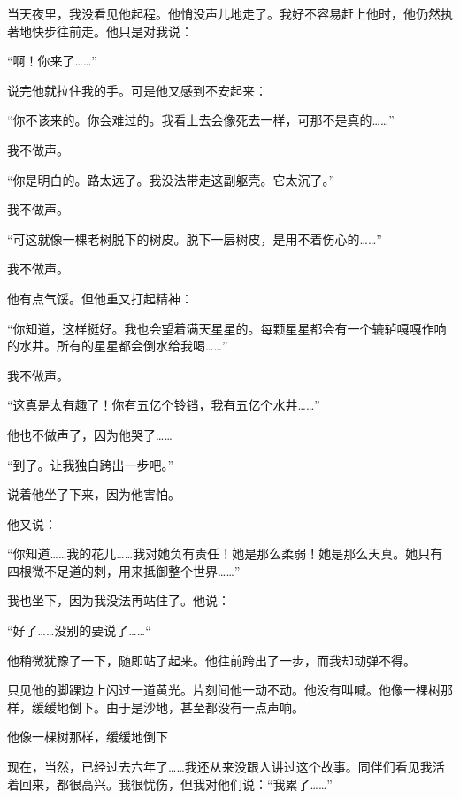 当天夜里，我没看见他起程。他悄没声儿地走了。我好不容易赶上他时，他仍然执著地快步往前走。他只是对我说：

“啊！你来了\ldots{}\ldots{}”

说完他就拉住我的手。可是他又感到不安起来：

“你不该来的。你会难过的。我看上去会像死去一样，可那不是真的\ldots{}\ldots{}”

我不做声。

“你是明白的。路太远了。我没法带走这副躯壳。它太沉了。”

我不做声。

“可这就像一棵老树脱下的树皮。脱下一层树皮，是用不着伤心的\ldots{}\ldots{}”

我不做声。

他有点气馁。但他重又打起精神：

“你知道，这样挺好。我也会望着满天星星的。每颗星星都会有一个辘轳嘎嘎作响的水井。所有的星星都会倒水给我喝\ldots{}\ldots{}”

我不做声。

“这真是太有趣了！你有五亿个铃铛，我有五亿个水井\ldots{}\ldots{}”

他也不做声了，因为他哭了\ldots{}\ldots{}

“到了。让我独自跨出一步吧。”

说着他坐了下来，因为他害怕。

他又说：

“你知道\ldots{}\ldots{}我的花儿\ldots{}\ldots{}我对她负有责任！她是那么柔弱！她是那么天真。她只有四根微不足道的刺，用来抵御整个世界\ldots{}\ldots{}”

我也坐下，因为我没法再站住了。他说：

“好了\ldots{}\ldots{}没别的要说了\ldots{}\ldots{}“

他稍微犹豫了一下，随即站了起来。他往前跨出了一步，而我却动弹不得。

只见他的脚踝边上闪过一道黄光。片刻间他一动不动。他没有叫喊。他像一棵树那样，缓缓地倒下。由于是沙地，甚至都没有一点声响。

{\startalignment[center]
 \stopalignment}

他像一棵树那样，缓缓地倒下


\stoptitle

\starttitle[title={27},reference={part0029.html_a030}]

现在，当然，已经过去六年了\ldots{}\ldots{}我还从来没跟人讲过这个故事。同伴们看见我活着回来，都很高兴。我很忧伤，但我对他们说：“我累了\ldots{}\ldots{}”

